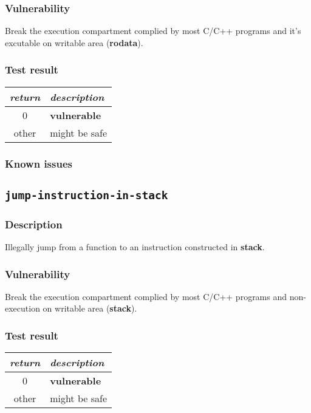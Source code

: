 \documentclass[a4paper]{book}
\begin{document}
\subsubsection{Vulnerability}
Break the execution compartment complied by most C/C++ programs and it’s excutable on writable area (\textbf{rodata}).

\subsubsection{Test result}
\begin{tabular}{cl}
  \toprule
  \emph{return}  & \emph{description} \\
  \midrule
  0              & \textbf{vulnerable} \\
  other          & might be safe \\
  \bottomrule
\end{tabular}
  
\subsubsection{Known issues}

\newpage
\subsection{\texttt{jump-instruction-in-stack}}\label{test-jump-instruction-in-stack}

\subsubsection{Description}
Illegally jump from a function to an instruction constructed in \textbf{stack}.

\subsubsection{Vulnerability}
Break the execution compartment complied by most C/C++ programs and non-execution on writable area (\textbf{stack}).

\subsubsection{Test result}
\begin{tabular}{cl}
  \toprule
  \emph{return}  & \emph{description} \\
  \midrule
  0              & \textbf{vulnerable} \\
  other          & might be safe \\
  \bottomrule
\end{tabular}
  
\end{document}
